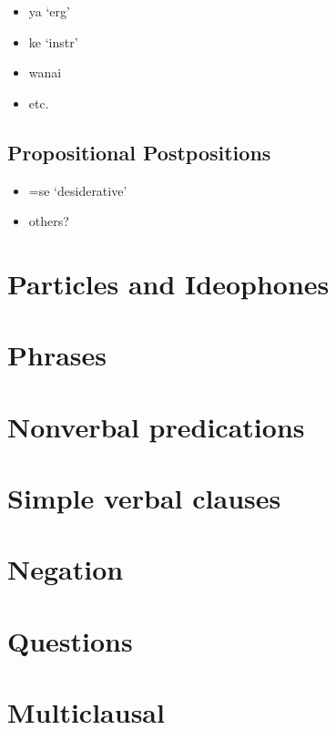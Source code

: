 \documentclass{memoir}
\begin{document}
\begin{itemize}
\tightlist
\item
  ya `erg'
\item
  ke `instr'
\item
  wanai
\item
  etc.
\end{itemize}

\section{Propositional Postpositions}

\begin{itemize}
\tightlist
\item
  =se `desiderative'
\item
  others?
\end{itemize}

\chapter{\texorpdfstring{Particles and Ideophones
\label{partideo}}{Particles and Ideophones }}

\chapter{\texorpdfstring{Phrases \label{phrases}}{Phrases }}

\chapter{\texorpdfstring{Nonverbal predications
\label{nonverbal}}{Nonverbal predications }}

\chapter{\texorpdfstring{Simple verbal clauses
\label{simpleverb}}{Simple verbal clauses }}

\chapter{\texorpdfstring{Negation \label{negation}}{Negation }}

\chapter{\texorpdfstring{Questions \label{questions}}{Questions }}

\chapter{\texorpdfstring{Multiclausal
\label{multiclausal}}{Multiclausal }}
\end{document}
